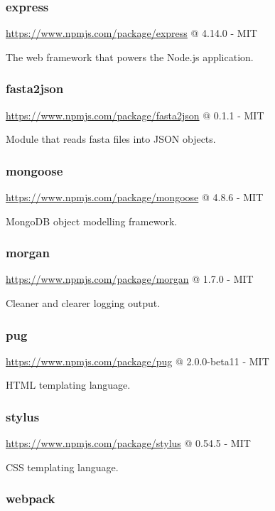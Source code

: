 \subsubsection*{express}

\url{https://www.npmjs.com/package/express} @ 4.14.0 - MIT

The web framework that powers the Node.js application.

\subsubsection*{fasta2json}

\url{https://www.npmjs.com/package/fasta2json} @ 0.1.1 - MIT

Module that reads fasta files into JSON objects.

\subsubsection*{mongoose}

\url{https://www.npmjs.com/package/mongoose} @ 4.8.6 - MIT

MongoDB object modelling framework.

\subsubsection*{morgan}

\url{https://www.npmjs.com/package/morgan} @ 1.7.0 - MIT

Cleaner and clearer logging output.

\subsubsection*{pug}

\url{https://www.npmjs.com/package/pug} @ 2.0.0-beta11 - MIT

HTML templating language.

\subsubsection*{stylus}

\url{https://www.npmjs.com/package/stylus} @ 0.54.5 - MIT

CSS templating language.

\subsubsection*{webpack}

